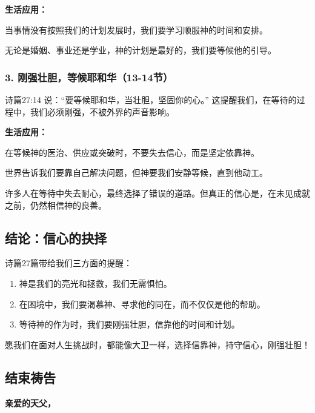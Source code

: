 \documentclass[a4paper, 12pt]{article}
\begin{document}
\vspace{0.2cm}

\textbf{生活应用：}

\hspace{0.6cm}当事情没有按照我们的计划发展时，我们要学习顺服神的时间和安排。

\hspace{0.6cm}无论是婚姻、事业还是学业，神的计划是最好的，我们要等候他的引导。
\subsubsection*{3. 刚强壮胆，等候耶和华（13-14节）}
\hspace{0.6cm}诗篇27:14 说：“要等候耶和华，当壮胆，坚固你的心。” 这提醒我们，在等待的过程中，我们必须刚强，不被外界的声音影响。

\vspace{0.2cm}

\textbf{生活应用：}

\hspace{0.6cm}在等候神的医治、供应或突破时，不要失去信心，而是坚定依靠神。

\hspace{0.6cm}世界告诉我们要靠自己解决问题，但神要我们安静等候，直到他动工。

\hspace{0.6cm}许多人在等待中失去耐心，最终选择了错误的道路。但真正的信心是，在未见成就之前，仍然相信神的良善。

\subsection*{结论：信心的抉择}
诗篇27篇带给我们三方面的提醒：
\begin{enumerate}
    \item 神是我们的亮光和拯救，我们无需惧怕。

    \item 在困境中，我们要渴慕神、寻求他的同在，而不仅仅是他的帮助。

    \item 等待神的作为时，我们要刚强壮胆，信靠他的时间和计划。

    
\end{enumerate}

愿我们在面对人生挑战时，都能像大卫一样，选择信靠神，持守信心，刚强壮胆！

\subsection*{结束祷告}
\textbf{亲爱的天父，}
\end{document}
